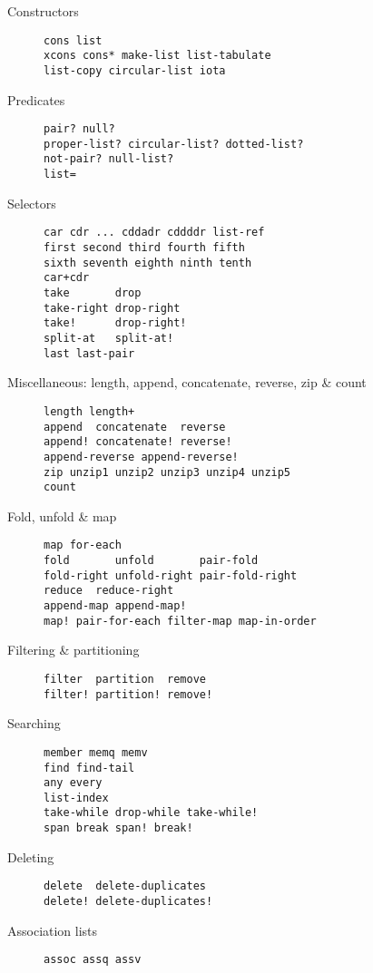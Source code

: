 \begin{description}
\item[ Constructors ]

\begin{verbatim}
cons list
xcons cons* make-list list-tabulate 
list-copy circular-list iota
\end{verbatim}
\item[ Predicates ]
\begin{verbatim}
pair? null?
proper-list? circular-list? dotted-list? 
not-pair? null-list?
list=
\end{verbatim}
\item[ Selectors ]
\begin{verbatim}
car cdr ... cddadr cddddr list-ref
first second third fourth fifth 
sixth seventh eighth ninth tenth
car+cdr
take       drop
take-right drop-right
take!      drop-right! 
split-at   split-at! 
last last-pair
\end{verbatim}
\item[ Miscellaneous: length, append, concatenate, reverse, zip \& count
]
\begin{verbatim}
length length+
append  concatenate  reverse
append! concatenate! reverse!
append-reverse append-reverse!
zip unzip1 unzip2 unzip3 unzip4 unzip5
count
\end{verbatim}
\item[ Fold, unfold \& map ]
\begin{verbatim}
map for-each
fold       unfold       pair-fold       
fold-right unfold-right pair-fold-right 
reduce  reduce-right 
append-map append-map!
map! pair-for-each filter-map map-in-order
\end{verbatim}
\item[ Filtering \& partitioning ]
\begin{verbatim}
filter  partition  remove
filter! partition! remove! 
\end{verbatim}
\item[ Searching ]
\begin{verbatim}
member memq memv
find find-tail 
any every
list-index
take-while drop-while take-while!
span break span! break!
\end{verbatim}
\item[ Deleting ]
\begin{verbatim}
delete  delete-duplicates 
delete! delete-duplicates!
\end{verbatim}
\item[ Association lists ]
\begin{verbatim}
assoc assq assv

\end{verbatim}
\end{description}
